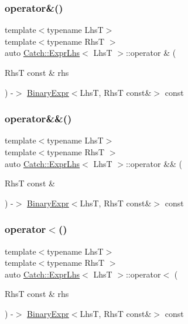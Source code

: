 \subsubsection{\texorpdfstring{operator\&()}{operator\&()}}
{\footnotesize\ttfamily template$<$typename LhsT$>$ \\
template$<$typename RhsT $>$ \\
auto \mbox{\hyperlink{class_catch_1_1_expr_lhs}{Catch\+::\+Expr\+Lhs}}$<$ LhsT $>$\+::operator \& (\begin{DoxyParamCaption}\item[{RhsT const \&}]{rhs }\end{DoxyParamCaption}) -\/$>$ \mbox{\hyperlink{class_catch_1_1_binary_expr}{Binary\+Expr}}$<$LhsT, RhsT const\&$>$ const \hspace{0.3cm}{\ttfamily [inline]}}

\mbox{\label{class_catch_1_1_expr_lhs_a5d85cdd34a136c37fa5e5283c2ff54d5}} 
\subsubsection{\texorpdfstring{operator\&\&()}{operator\&\&()}}
{\footnotesize\ttfamily template$<$typename LhsT$>$ \\
template$<$typename RhsT $>$ \\
auto \mbox{\hyperlink{class_catch_1_1_expr_lhs}{Catch\+::\+Expr\+Lhs}}$<$ LhsT $>$\+::operator \&\& (\begin{DoxyParamCaption}\item[{RhsT const \&}]{ }\end{DoxyParamCaption}) -\/$>$ \mbox{\hyperlink{class_catch_1_1_binary_expr}{Binary\+Expr}}$<$LhsT, RhsT const\&$>$ const \hspace{0.3cm}{\ttfamily [inline]}}

\mbox{\label{class_catch_1_1_expr_lhs_a55284221df2edb3542e765c87b5691b9}} 
\subsubsection{\texorpdfstring{operator$<$()}{operator<()}}
{\footnotesize\ttfamily template$<$typename LhsT$>$ \\
template$<$typename RhsT $>$ \\
auto \mbox{\hyperlink{class_catch_1_1_expr_lhs}{Catch\+::\+Expr\+Lhs}}$<$ LhsT $>$\+::operator$<$ (\begin{DoxyParamCaption}\item[{RhsT const \&}]{rhs }\end{DoxyParamCaption}) -\/$>$ \mbox{\hyperlink{class_catch_1_1_binary_expr}{Binary\+Expr}}$<$LhsT, RhsT const\&$>$ const \hspace{0.3cm}{\ttfamily [inline]}}

